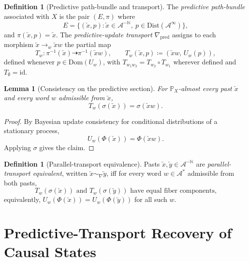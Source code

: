 \documentclass[11pt,a4paper]{article}
\theoremstyle{plain}
\newtheorem{lemma}[theorem]{Lemma}
\theoremstyle{definition}
\newtheorem{definition}[theorem]{Definition}
\theoremstyle{remark}
\newcommand{\Dist}{\mathrm{Dist}}
\newcommand{\Prob}{\mathbb{P}}
\newcommand{\eqdef}{\coloneqq}
\newcommand{\Alphabet}{\mathcal{A}}
\newcommand{\Pred}{\nabla_{\mathrm{pred}}}
\newcommand{\Dom}{\mathrm{Dom}}
\newcommand{\Past}{\overleftarrow{x}}
\newcommand{\Pasts}{\Alphabet^{-\mathbb{N}}}
\begin{document}
\begin{definition}[Predictive path-bundle and transport]
\label{def:bundle}
The \emph{predictive path-bundle} associated with $X$ is the pair $(E, \pi)$ where
\begin{equation}
    E = \bigl\{ (\Past, p) : \Past \in \Pasts, \ p \in \Dist(\Alphabet^\infty) \bigr\},
\end{equation}
and $\pi(\Past, p) = \Past$. The \emph{predictive-update transport} $\Pred$ assigns to each morphism $\Past \to_w \Past w$ the partial map
\begin{equation}
    T_w : \pi^{-1}(\Past) \dashrightarrow \pi^{-1}(\Past w), \qquad T_w(\Past, p) \eqdef (\Past w, \, U_w(p)),
\end{equation}
defined whenever $p \in \Dom(U_w)$, with $T_{w_1 w_2} = T_{w_2} \circ T_{w_1}$ wherever defined and $T_\emptyset = \mathrm{id}$.
\end{definition}

\begin{lemma}[Consistency on the predictive section]
\label{lem:consistency}
For $\Prob_X$-almost every past $\Past$ and every word $w$ admissible from $\Past$,
\begin{equation}
    T_w(\sigma(\Past)) = \sigma(\Past w).
\end{equation}
\end{lemma}

\begin{proof}
By Bayesian update consistency for conditional distributions of a stationary process,
\begin{equation}
    U_w(\Phi(\Past)) = \Phi(\Past w).
\end{equation}
Applying $\sigma$ gives the claim.
\end{proof}

\begin{definition}[Parallel-transport equivalence]
\label{def:transport-eq}
Pasts $\Past, \overleftarrow{y} \in \Pasts$ are \emph{parallel-transport equivalent}, written $\Past \sim_\nabla \overleftarrow{y}$, iff for every word $w \in \Alphabet^*$ admissible from both pasts,
\begin{equation}
    T_w(\sigma(\Past)) \text{ and } T_w(\sigma(\overleftarrow{y})) \text{ have equal fiber components,}
\end{equation}
equivalently, $U_w(\Phi(\Past)) = U_w(\Phi(\overleftarrow{y}))$ for all such $w$.
\end{definition}

\section{Predictive-Transport Recovery of Causal States}
\label{sec:identification}
\end{document}

